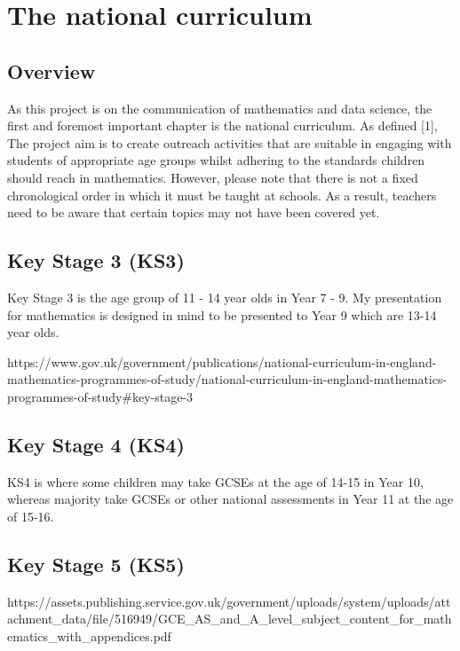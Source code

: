 \documentclass[12pt, a4paper,oneside]{book}
\numberwithin{equation}{section}
\begin{document}
\chapter{The national curriculum}\label{ch:x}

\section{Overview}\label{sec:x.x}

As this project is on the communication of mathematics and data science, the first and foremost important chapter is the national curriculum. As defined [1], The project aim is to create outreach activities that are suitable in engaging with students of appropriate age groups whilst adhering to the standards children should reach in mathematics. However, please note that there is not a fixed chronological order in which it must be taught at schools. As a result, teachers need to be aware that certain topics may not have been covered yet.

\section{Key Stage 3 (KS3)}\label{sec:x.x}

Key Stage 3 is the age group of 11 - 14 year olds in Year 7 - 9. My presentation for mathematics is designed in mind to be presented to Year 9 which are 13-14 year olds.

https://www.gov.uk/government/publications/national-curriculum-in-england-mathematics-programmes-of-study/national-curriculum-in-england-mathematics-programmes-of-study#key-stage-3

\section{Key Stage 4 (KS4)}\label{sec:x.x}

KS4 is where some children may take GCSEs at the age of 14-15 in Year 10, whereas majority take GCSEs or other national assessments in Year 11 at the age of 15-16.

\section{Key Stage 5 (KS5)}\label{sec:x.x}



https://assets.publishing.service.gov.uk/government/uploads/system/uploads/attachment_data/file/516949/GCE_AS_and_A_level_subject_content_for_mathematics_with_appendices.pdf
\end{document}
